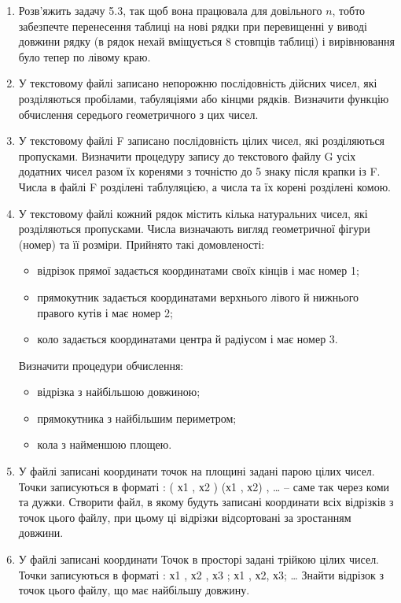 \documentclass[a5paper,titlepage,openany,twoside,draft]{book_unv}%
\begin{document}
\begin{enumerate}
\item 
Розв'яжить задачу 5.3, так щоб вона працювала для довільного $n$, тобто
забезпечте перенесення таблиці на нові рядки при перевищенні у виводі довжини рядку
(в рядок нехай вміщується 8 стовпців таблиці) і вирівнювання було тепер по лівому краю.

\item
У текстовому файлі записано непорожню послідовність дійсних чисел,
які розділяються пробілами, табуляціями або кінцми рядків.
 Визначити функцію обчислення середього геометричного з цих чисел.

\item
У текстовому файлі F записано послідовність цілих чисел, які розділяються пропусками. 
Визначити процедуру запису до текстового файлу G усіх додатних чисел разом їх коренями з 
точністю до 5 знаку після крапки із F. Числа в файлі F розділені таблуляцією, 
а числа та їх корені розділені комою.

\item
У текстовому файлі кожний рядок містить кілька натуральних чисел, які розділяються пропусками.
Числа визначають вигляд геометричної фігури (номер) та її розміри. Прийнято такі домовленості:
\begin{itemize}
\item
відрізок прямої задається координатами своїх кінців і має номер 1;
\item
прямокутник задається координатами верхнього лівого й нижнього правого кутів і має номер 2;
\item
коло задається координатами центра й радіусом і має номер 3.
\end{itemize}

Визначити процедури обчислення:
\begin{itemize}
\item відрізка з найбільшою довжиною;
\item прямокутника з найбільшим периметром;
\item кола з найменшою площею.
\end{itemize}


\item 
У файлі записані координати точок на площині задані парою цілих
чисел. Точки записуються в форматі : ( х1 , х2 ) (х1 , х2) , \ldots{} --
саме так через коми та дужки. Створити файл, в якому будуть записані
координати всіх відрізків з точок цього файлу, при цьому ці відрізки
відсортовані за зростанням довжини.

\item 
У файлі записані координати Точок в просторі задані трійкою цілих
чисел. Точки записуються в форматі : х1 , х2 , х3 ; х1 , х2, х3;
\ldots{} Знайти відрізок з точок цього файлу, що має найбільшу довжину.


\end{enumerate}
\end{document}
